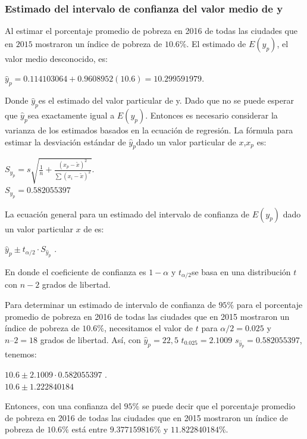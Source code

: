 \documentclass[twocolumn,twoside]{article}
\begin{document}
\subsubsection{Estimado del intervalo de confianza del valor medio de y}

Al estimar el porcentaje promedio de pobreza en 2016 de todas las ciudades que en $2015$ mostraron
un \'indice de pobreza de $10.6\%$. El estimado de $E(y_p)$, el valor medio desconocido, es:
\begin{center}
  $\hat y_p=0.114103064+0.9608952(10.6)= 10.299591979$.

\end{center}
Donde $\hat y_p$es el estimado del valor particular de y.
Dado que no se puede esperar que $\hat y_p$sea exactamente igual a $E(y_p)$. Entonces es necesario
considerar la varianza de los estimados basados en la ecuaci\'on de regresi\'on. La f\'ormula para
estimar la desviaci\'on est\'andar de $\hat y_p$dado un valor particular de $x$,$x_p$ es:
\begin{center}
  $S_{\hat y_p}=s\sqrt{\frac{1}{n}+\frac{(x_p-\tilde x)^2}{\sum (x_i-\tilde x)^2}}$.\\
  $S_{\hat y_p}=0.582055397$
\end{center}

La ecuaci\'on general para un estimado del intervalo
de confianza de $E(y_p )$ dado un valor particular $x$ de es:
\begin{center}
  $\hat y_p\pm t_{\alpha/2}\cdot S_{\hat y_p}$  .\\
\end{center}
En donde el coeficiente de confianza es $1-\alpha$ y $t_{\alpha/2}$se basa en una distribuci\'on $t$ con $n-2$ grados de
libertad.

Para determinar un estimado de intervalo de confianza de $95\%$ para el porcentaje promedio
de pobreza en 2016 de todas las ciudades que en 2015 mostraron un \'indice de pobreza de $10.6\%$,
necesitamos el valor de $t$ para $\alpha/2=0.025$ y $n–2= 18$ grados de libertad. As\'i, con $\hat y_p=22,5$ 
 $t_0.025 =2.1009$ $s_{\hat y_p} =0.582055397$, tenemos:
 \begin{center}
  $10.6\pm2.1009\cdot0.582055397$  .\\
  $10.6\pm 1.222840184$ 
\end{center}
Entonces, con una confianza del $95\%$ se puede decir que el porcentaje promedio de pobreza en 2016
de todas las ciudades que en 2015 mostraron un \'indice de pobreza de $10.6\%$ est\'a entre $9.377159816\%$
y $11.822840184\%$.
\end{document}
